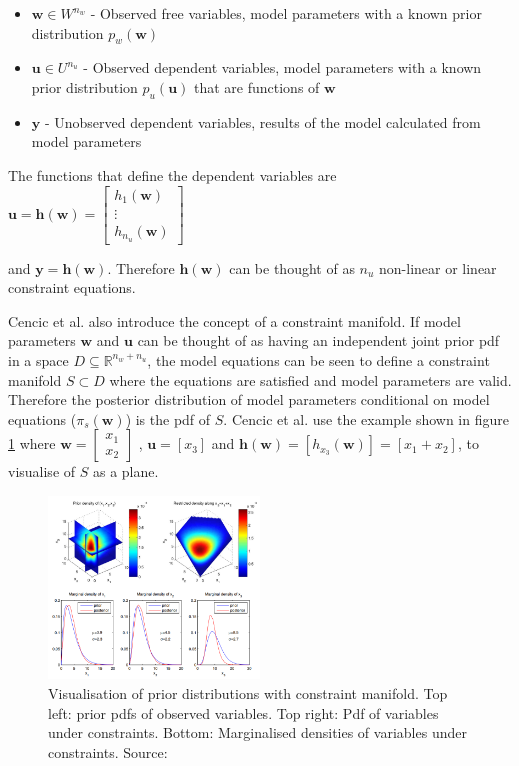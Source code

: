 \documentclass[ %
                    author={Tom Jager},
                supervisor={Dr. Daniel Schien},
                    degree={MEng},
                     title={A Bayesian Inference Engine for Calibrating Uncertainty over UMIS Structured MFA Systems},
                  subtitle={},
                      type={research},
                      year={2019} ]{dissertation}
\begin{document}
\begin{itemize}
    \item $\bm{w} \in W^{n_w}$ - Observed free variables, model parameters with a known prior distribution $p_w(\bm{w})$
    \item $\bm{u} \in U^{n_u}$ - Observed dependent variables, model parameters with a known prior distribution $p_u(\bm{u})$ that are functions of $\bm{w}$
    \item $\bm{y}$ - Unobserved dependent variables, results of the model calculated from model parameters
\end{itemize}

The functions that define the dependent variables are $\bm{u} = \bm{h}(\bm{w}) = \begin{bmatrix}
    h_1(\bm{w}) \\
    \vdots \\
    h_{n_u}(\bm{w})
\end{bmatrix}$

and $\bm{y} = \bm{h}(\bm{w})$. Therefore $\bm{h}(\bm{w})$ can be thought of as $n_u$ non-linear or linear constraint equations. 

Cencic et al. also introduce the concept of a constraint manifold. If model parameters $\bm{w}$ and $\bm{u}$ can be thought of as having an independent joint prior pdf in a space $D \subseteq \mathbb{R}^{n_w + n_u}$, the model equations can be seen to define a constraint manifold $S \subset D$ where the equations are satisfied and model parameters are valid. Therefore the posterior distribution of model parameters conditional on model equations ($\pi_s(\bm{w})$) is the pdf of $S$. Cencic et al. use the example shown in figure \ref{fig:cencic_manifold} where $\bm{w} = \begin{bmatrix}
    x_1 \\
    x_2
\end{bmatrix}$
, $\bm{u} = [x_3]$ and $\bm{h}(\bm{w}) = [h_{x_3}(\bm{w})] = [x_1 + x_2]$, to visualise of $S$ as a plane. 

\begin{figure}[]
\centering
\includegraphics[width=0.5\textwidth]{images/cencic_manifold.png}
\caption{Visualisation of prior distributions with constraint manifold. Top left: prior pdfs of observed variables. Top right: Pdf of variables under constraints. Bottom: Marginalised densities of variables under constraints. Source: \cite{cencic2015general}}
\label{fig:cencic_manifold}
\end{figure}
\end{document}
